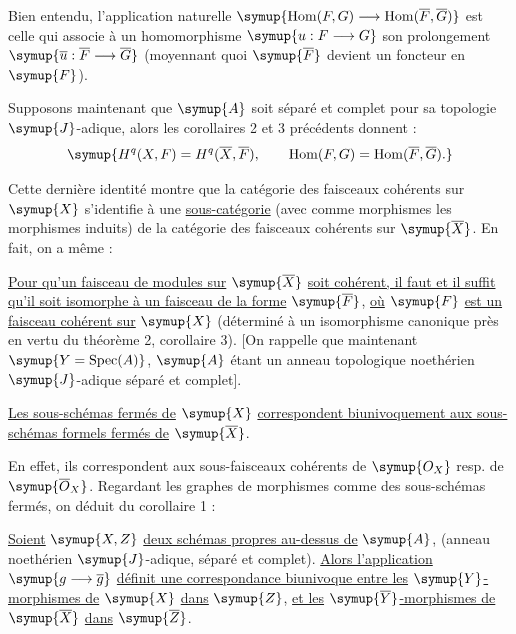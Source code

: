 Bien entendu, l'application naturelle
$\symup{\operatorname{Hom}(F,G)\longrightarrow
\operatorname{Hom}(\overline F,\overline G)}$ est celle qui associe à un
homomorphisme $\symup{u:F\longrightarrow G}$ son prolongement 
$\symup{\overline u:\overline F\longrightarrow\overline G}$ (moyennant quoi
$\symup{\overline F}$ devient un foncteur en $\symup{F}$).

Supposons maintenant que $\symup{A}$ soit séparé et complet pour sa topologie
$\symup{J}$-adique, alors les corollaires 2 et 3 précédents donnent :
\[
  \symup{H^{q}(X,F)=H^{q}(\overline X,\overline F),
  \qquad
  \operatorname{Hom}(F,G)
  =\operatorname{Hom}(\overline F,\overline G).}
\]

Cette dernière identité montre que la catégorie des faisceaux cohérents sur
$\symup{X}$ s'identifie à une \uline{sous-catégorie} (avec comme morphismes les
morphismes induits) de la catégorie des faisceaux cohérents sur $\symup{\overline X}$.
En fait, on a même :

 \uline{Pour qu'un faisceau de modules sur} $\symup{\overline X}$ \uline{soit
cohérent, il faut et il suffit qu'il soit isomorphe à un faisceau de la forme}
$\symup{\overline F}$, \uline{où} $\symup{F}$ \uline{est un faisceau cohérent sur} $\symup{X}$ (déterminé à un
isomorphisme canonique près en vertu du théorème 2, corollaire 3). [On rappelle
que maintenant $\symup{Y=\operatorname{Spec}(A)}$, $\symup{A}$ étant un anneau topologique
noethérien $\symup{J}$-adique séparé et complet].

 \uline{Les sous-schémas fermés de} $\symup{X}$ \uline{correspondent
biunivoquement aux sous-schémas formels fermés de} $\symup{\overline X}$.

En effet, ils correspondent aux sous-faisceaux cohérents de $\symup{O_X}$ resp. de
$\symup{\overline{O}_X}$. Regardant les graphes de morphismes comme des sous-schémas
fermés, on déduit du corollaire 1 :

 \uline{Soient} $\symup{X,Z}$ \uline{deux schémas propres au-dessus de} $\symup{A}$,
(anneau noethérien $\symup{J}$-adique, séparé et complet). \uline{Alors l'application}
$\symup{g\longrightarrow\overline g}$ \uline{définit une correspondance biunivoque entre les}
$\symup{Y}$\uline{-morphismes de} $\symup{X}$ \uline{dans} $\symup{Z}$, \uline{et les} $\symup{\overline Y}$\uline{-morphismes de}
$\symup{\overline X}$ \uline{dans} $\symup{\overline Z}$.


